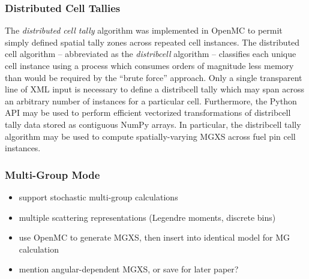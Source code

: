 \subsubsection{Distributed Cell Tallies}
\label{subsec:distribcells}


The \textit{distributed cell tally} algorithm was implemented in OpenMC \cite{lax2014distribcell} to permit simply defined spatial tally zones across repeated cell instances. The distributed cell algorithm -- abbreviated as the \textit{distribcell} algorithm -- classifies each unique cell instance using a process which consumes orders of magnitude less memory than would be required by the ``brute force'' approach. Only a single transparent line of XML input is necessary to define a distribcell tally which may span across an arbitrary number of instances for a particular cell. Furthermore, the Python API may be used to perform efficient vectorized transformations of distribcell tally data stored as contiguous NumPy arrays. In particular, the distribcell tally algorithm may be used to compute spatially-varying MGXS across fuel pin cell instances.

\subsubsection{Multi-Group Mode}
\label{subsec:openmc-mg-mode}

\begin{itemize}[noitemsep]
\item support stochastic multi-group calculations
\item multiple scattering representations (Legendre moments, discrete bins)
\item use OpenMC to generate MGXS, then insert into identical model for MG calculation
\item mention angular-dependent MGXS, or save for later paper?
\end{itemize}


